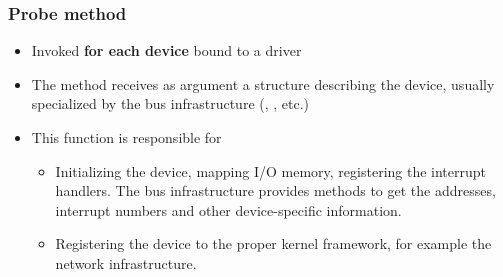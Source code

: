 \begin{frame}
  \frametitle{Probe method}
  \begin{itemize}
  \item Invoked {\bf for each device} bound to a driver
  \item The  method receives as argument a structure
    describing the device, usually specialized by the bus
    infrastructure (, , etc.)
  \item This function is responsible for
    \begin{itemize}
    \item Initializing the device, mapping I/O memory, registering the
      interrupt handlers. The bus infrastructure provides methods to
      get the addresses, interrupt numbers and other device-specific
      information.
    \item Registering the device to the proper kernel framework, for
      example the network infrastructure.
    \end{itemize}
  \end{itemize}
\end{frame}

